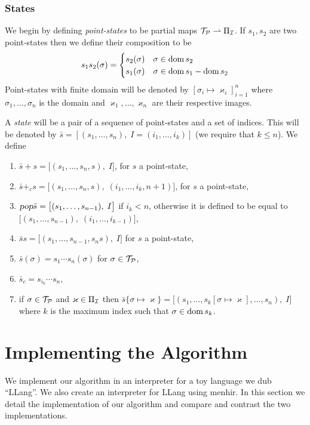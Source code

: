 \documentclass{llncs}
\newcounter{algo}
\begin{document}
\subsubsection{States}

We begin by defining \textit{point-states} to be partial maps $\mathcal T_{\mathcal P}\rightharpoonup\Pi_{\mathcal I}$.
If $s_1,s_2$ are two point-states then we define their composition to be
\[ s_1s_2(\sigma) = \begin{cases} s_2(\sigma) & \sigma\in\operatorname{dom} s_2\\ s_1(\sigma) & \sigma\in\operatorname{dom} s_1-\operatorname{dom} s_2\end{cases} \]
Point-states with finite domain will be denoted by $[\sigma_i\mapsto\varkappa_i]_{i=1}^n$ where $\sigma_1,\dots,\sigma_n$ is the domain and $\varkappa_1,\dots,\varkappa_n$ are their respective images.

A \textit{state} will be a pair of a sequence of point-states and a set of indices.
This will be denoted by $\bar s=[(s_1,\dots,s_n),\;I=(i_1,\dots,i_k)]$ (we require that $k\leq n$).
We define
\begin{enumerate}
    \item $\bar s+s=\bigl[(s_1,\dots,s_n,s),\;I\bigr]$, for $s$ a point-state,
    \item $\bar s+_cs=\bigl[(s_1,\dots,s_n,s),\;(i_1,\dots,i_k,n+1)\bigr]$, for $s$ a point-state,
    \item $\textsl{pop}\bar s=\bigl[(s_1,\dots,s_{n-1}),\;I\bigr]$ if $i_k<n$, otherwise it is defined to be equal to $\bigl[(s_1,\dots,s_{n-1}),\;(i_1,\dots,i_{k-1})\bigr]$,
    \item $\bar ss=\bigl[(s_1,\dots,s_{n-1},s_ns),\;I\bigr]$ for $s$ a point-state,
    \item $\bar s(\sigma)=s_1\cdots s_n(\sigma)$ for $\sigma\in\mathcal T_{\mathcal P}$,
    \item $\bar s_c=s_{i_k}\cdots s_n$,
    \item if $\sigma\in\mathcal T_{\mathcal P}$ and $\varkappa\in\Pi_{\mathcal I}$ then $\bar s\{\sigma\mapsto\varkappa\}=\bigl[(s_1,\dots,s_k[\sigma\mapsto\varkappa],\dots,s_n),\;I\bigr]$ where $k$ is the maximum index such that
    $\sigma\in\operatorname{dom} s_k$.
\end{enumerate}

\section{Implementing the Algorithm}

We implement our algorithm in an interpreter for a toy language we dub ``LLang''.
We also create an interpreter for LLang using menhir\NEEDCITE{}.
In this section we detail the implementation of our algorithm and compare and contrast the two implementations.
\end{document}
